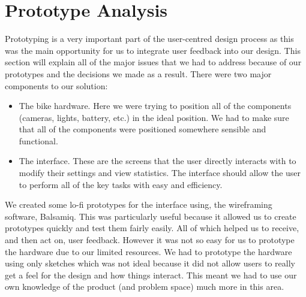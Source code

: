 \documentclass[a4paper]{report}
\begin{document}
\chapter{Prototype Analysis}
\label{ch: prototype}
Prototyping is a very important part of the user-centred design process as this was the main opportunity for us to integrate user feedback into our design. This section will explain all of the major issues that we had to address because of our prototypes and the decisions we made as a result. There were two major components to our solution:
\begin{itemize}
  \item The bike hardware. Here we were trying to position all of the components (cameras, lights, battery, etc.) in the ideal position. We had to make sure that all of the components were positioned somewhere sensible and functional.
  \item The interface. These are the screens that the user directly interacts with to modify their settings and view statistics. The interface should allow the user to perform all of the key tasks with easy and efficiency.
\end{itemize}
We created some lo-fi prototypes for the interface using, the wireframing software, Balsamiq\cite{balsamiq}. This was particularly useful because it allowed us to create prototypes quickly and test them fairly easily. All of which helped us to receive, and then act on, user feedback. However it was not so easy for us to prototype the hardware due to our limited resources. We had to prototype the hardware using only sketches which was not ideal because it did not allow users to really get a feel for the design and how things interact. This meant we had to use our own knowledge of the product (and problem space) much more in this area.
\end{document}
